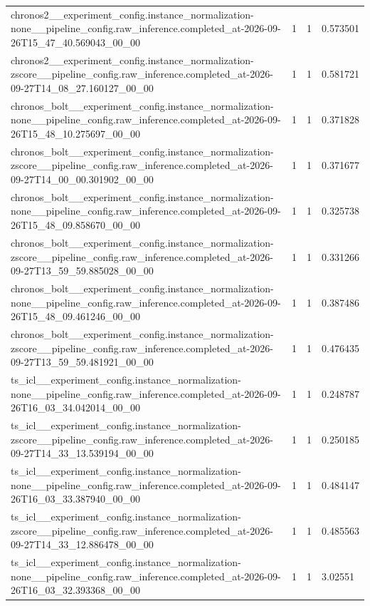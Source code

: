 \begin{tabular}{llll}
chronos2\_\_experiment\_config.instance\_normalization-none\_\_pipeline\_config.raw\_inference.completed\_at-2026-09-26T15\_47\_40.569043\_00\_00 & 1 & 1 & 0.573501 \\
chronos2\_\_experiment\_config.instance\_normalization-zscore\_\_pipeline\_config.raw\_inference.completed\_at-2026-09-27T14\_08\_27.160127\_00\_00 & 1 & 1 & 0.581721 \\
chronos\_bolt\_\_experiment\_config.instance\_normalization-none\_\_pipeline\_config.raw\_inference.completed\_at-2026-09-26T15\_48\_10.275697\_00\_00 & 1 & 1 & 0.371828 \\
chronos\_bolt\_\_experiment\_config.instance\_normalization-zscore\_\_pipeline\_config.raw\_inference.completed\_at-2026-09-27T14\_00\_00.301902\_00\_00 & 1 & 1 & 0.371677 \\
chronos\_bolt\_\_experiment\_config.instance\_normalization-none\_\_pipeline\_config.raw\_inference.completed\_at-2026-09-26T15\_48\_09.858670\_00\_00 & 1 & 1 & 0.325738 \\
chronos\_bolt\_\_experiment\_config.instance\_normalization-zscore\_\_pipeline\_config.raw\_inference.completed\_at-2026-09-27T13\_59\_59.885028\_00\_00 & 1 & 1 & 0.331266 \\
chronos\_bolt\_\_experiment\_config.instance\_normalization-none\_\_pipeline\_config.raw\_inference.completed\_at-2026-09-26T15\_48\_09.461246\_00\_00 & 1 & 1 & 0.387486 \\
chronos\_bolt\_\_experiment\_config.instance\_normalization-zscore\_\_pipeline\_config.raw\_inference.completed\_at-2026-09-27T13\_59\_59.481921\_00\_00 & 1 & 1 & 0.476435 \\
ts\_icl\_\_experiment\_config.instance\_normalization-none\_\_pipeline\_config.raw\_inference.completed\_at-2026-09-26T16\_03\_34.042014\_00\_00 & 1 & 1 & 0.248787 \\
ts\_icl\_\_experiment\_config.instance\_normalization-zscore\_\_pipeline\_config.raw\_inference.completed\_at-2026-09-27T14\_33\_13.539194\_00\_00 & 1 & 1 & 0.250185 \\
ts\_icl\_\_experiment\_config.instance\_normalization-none\_\_pipeline\_config.raw\_inference.completed\_at-2026-09-26T16\_03\_33.387940\_00\_00 & 1 & 1 & 0.484147 \\
ts\_icl\_\_experiment\_config.instance\_normalization-zscore\_\_pipeline\_config.raw\_inference.completed\_at-2026-09-27T14\_33\_12.886478\_00\_00 & 1 & 1 & 0.485563 \\
ts\_icl\_\_experiment\_config.instance\_normalization-none\_\_pipeline\_config.raw\_inference.completed\_at-2026-09-26T16\_03\_32.393368\_00\_00 & 1 & 1 & 3.02551 \\

\end{tabular}
